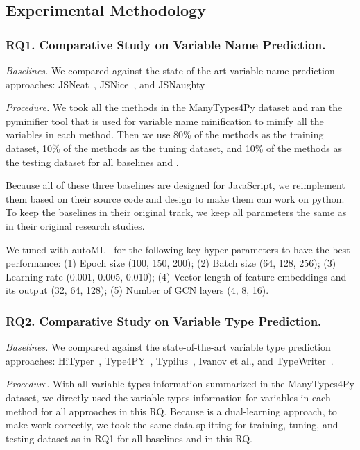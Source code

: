 

\subsection{Experimental Methodology}
\label{empirical-method}

\subsubsection{RQ1. Comparative Study on Variable Name Prediction.}

{\em Baselines.} We compared {\tool} against the state-of-the-art variable name prediction approaches: JSNeat~\cite{tran2019recovering}, JSNice~\cite{JSNice2015}, and JSNaughty~\cite{JSNaughty2017} 

\textit{Procedure.} We took all the methods in the ManyTypes4Py dataset and ran the pyminifier \cite{pyminifier} tool that is used for variable name minification to minify all the variables in each method. Then we use 80\% of the methods as the training dataset, 10\% of the methods as the tuning dataset, and 10\% of the methods as the testing dataset for all baselines and {\tool}.

Because all of these three baselines are designed for JavaScript, we reimplement them based on their source code and design to make them can work on python. To keep the baselines in their original track, we keep all parameters the same as in their original research studies.

We tuned {\tool} with autoML~\cite{NNI} for the following key hyper-parameters to have the best performance: (1) Epoch size (100, 150, 200); (2) Batch size (64, 128, 256); (3) Learning rate (0.001, 0.005, 0.010); (4) Vector length of feature embeddings and its
output (32, 64, 128); (5) Number of GCN layers (4, 8, 16). 

\subsubsection{RQ2. Comparative Study on Variable Type Prediction.}

{\em Baselines.} We compared {\tool} against the state-of-the-art variable type prediction approaches: HiTyper~\cite{type-graph-icse22}, Type4PY~\cite{mir2021type4py}, Typilus~\cite{allamanis2020typilus}, Ivanov et al.\cite{ivanov21predicting}, and TypeWriter~\cite{typewriter-fse20}.



\textit{Procedure.} With all variable types information summarized in the ManyTypes4Py dataset, we directly used the variable types information for variables in each method for all approaches in this RQ. Because {\tool} is a dual-learning approach, to make {\tool} work correctly, we took the same data splitting for training, tuning, and testing dataset as in RQ1 for all baselines and {\tool} in this RQ.

